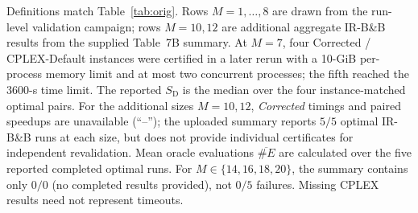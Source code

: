 \documentclass[11pt,a4paper]{article}
\begin{document}
\begin{table}[H]
\begin{threeparttable}
\begin{tablenotes}[flushleft]
\item Definitions match Table~\ref{tab:orig}. Rows $M=1,\ldots,8$ are drawn from the run-level validation campaign; rows $M=10,12$ are additional aggregate IR-B\&B results from the supplied Table~7B summary. At $M=7$, four Corrected / CPLEX-Default instances were certified in a later rerun with a 10-GiB per-process memory limit and at most two concurrent processes; the fifth reached the 3600-s time limit. The reported $S_\mathrm{D}$ is the median over the four instance-matched optimal pairs. For the additional sizes $M=10,12$, \emph{Corrected} timings and paired speedups are unavailable (``--''); the uploaded summary reports $5/5$ optimal IR-B\&B runs at each size, but does not provide individual certificates for independent revalidation. Mean oracle evaluations $\overline{\#E}$ are calculated over the five reported completed optimal runs. For $M\in\{14,16,18,20\}$, the summary contains only $0/0$ (no completed results provided), not $0/5$ failures. Missing CPLEX results need not represent timeouts.
\end{tablenotes}
\end{threeparttable}
\end{table}
\end{document}
